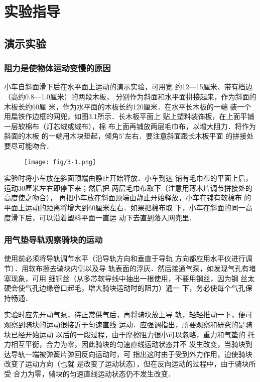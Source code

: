 \section{实验指导}
\subsection{演示实验}

\subsubsection{阻力是使物体运动变慢的原因}
小车自斜面滑下后在水平面上运动的演示实验，可用宽
约12—15厘米、带有档边（高约0.8—1.0厘米）的两段木板，
分别作为斜面和水平面拼接起来，作为斜面的木板长约60厘
米，作为水平面的木板长约120厘米．在水平长木板的一端
装一个用扁铁作边框的网兜，如图3.1所示．长木板平面上
贴上塑料装饰板，在上面平铺一层软棉布（灯芯绒或绒布），棉
布上面再铺放两层毛巾布，以增大阻力．将作为斜面的木板
的一端用木块垫起，倾角$5^{\circ}$左右．要注意斜面跟长木板平面
的拼接处要尽可能吻合．
\begin{figure}[htp]
    \centering
    \texttt{[image: fig/3-1.png]}
    \caption{}
\end{figure}

实验时将小车放在斜面顶端由静止开始释放．小车到达
铺有毛巾布的平面上后，运动30厘米左右即停下来；然后把
两层毛巾布取下（注意用薄木片调节拼接处的高度使之吻合），
再把小车放在斜面顶端由静止开始释放，小车在铺有软棉布
的平面上运动的距离将增大到60厘米左右．如果把棉布取
下，小车在斜面的同一高度滑下后，可以沿着塑料平面一直运
动下去直到落入网兜里．

\subsubsection{用气垫导轨观察骑块的运动}
使用前必须将导轨调节水平（沿导轨方向和垂直于导轨
方向都应用水平仪进行调节）．用软布擦去骑块内侧以及导
轨表面的浮灰．然后接通气泵，如发现气孔有堵塞现象，可用
细铜丝（从多芯软导线中抽出一根使用，不要用钢丝，因为钢
丝太硬会使气孔边缘卷口起毛，增大骑块运动时的阻力）通一
下，务必使每个气孔保持畅通．

实验时应先开动气泵，待正常供气后，再将骑块放上导
轨，轻轻推动一下，便可观察到骑块的运动很接近于匀速直线
运动．应强调指出，所要观察和研究的是骑块已经开始运动
以后的一段过程，由于摩擦阻力很小可以忽略，重力和气垫的
托力相互平衡，合力为零，因此骑块的匀速直线运动状态并不
发生改变，当骑块到达导轨一端被弹簧片弹回反向运动时，可
指出这时由于受到外力作用，迫使骑块改变了运动方向（也就
是改变了运动状态），但在反向运动的过程中，由于骑块所受
合力为零，骑块的匀速直线运动状态仍不发生改变．

